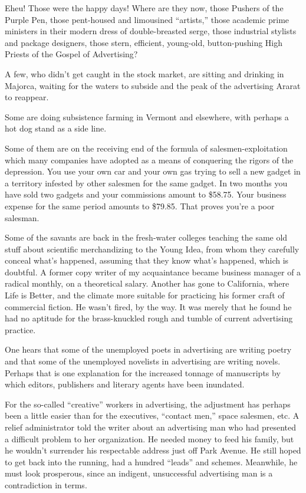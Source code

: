 \documentclass[openany,nobib]{tufte-book}
\begin{document}
Eheu! Those were the happy days! Where are they now, those Pushers of
the Purple Pen, those pent-housed and limousined ``artists,'' those
academic prime ministers in their modern dress of double-breasted serge,
those industrial stylists and package designers, those stern, efficient,
young-old, button-pushing High Priests of the Gospel of Advertising?

A few, who didn't get caught in the stock market, are sitting and
drinking in Majorca, waiting for the waters to subside and the peak of
the advertising Ararat to reappear.

Some are doing subsistence farming in Vermont and elsewhere, with
perhaps a hot dog stand as a side line.

Some of them are on the receiving end of the formula of
salesmen-exploitation which many companies have adopted as a means of
conquering the rigors of the depression. You use your own car and your
own gas trying to sell a new gadget in a territory infested by other
salesmen for the same gadget. In two months you have sold two gadgets
and your commissions amount to \$58.75. Your business expense for the
same period amounts to \$79.85. That proves you're a poor salesman.

Some of the savants are back in the fresh-water colleges teaching the
same old stuff about scientific merchandizing to the Young Idea, from
whom they carefully conceal what's happened, assuming that they know
what's happened, which is doubtful.
\clearpage
A former copy writer of my acquaintance became business manager of a
radical monthly, on a theoretical salary. Another has gone to
California, where Life is Better, and the climate more suitable for
practicing his former craft of commercial fiction. He wasn't fired, by
the way. It was merely that he found he had no aptitude for the
brass-knuckled rough and tumble of current advertising practice.

One hears that some of the unemployed poets in advertising are writing
poetry and that some of the unemployed novelists in advertising are
writing novels. Perhaps that is one explanation for the increased
tonnage of manuscripts by which editors, publishers and literary agents
have been inundated.

For the so-called ``creative'' workers in advertising, the adjustment
has perhaps been a little easier than for the executives, ``contact
men,'' space salesmen, etc. A relief administrator told the writer about
an advertising man who had presented a difficult problem to her
organization. He needed money to feed his family, but he wouldn't
surrender his respectable address just off Park Avenue. He still hoped
to get back into the running, had a hundred ``leads'' and schemes.
Meanwhile, he must look prosperous, since an indigent, unsuccessful
advertising man is a contradiction in terms.
\end{document}

